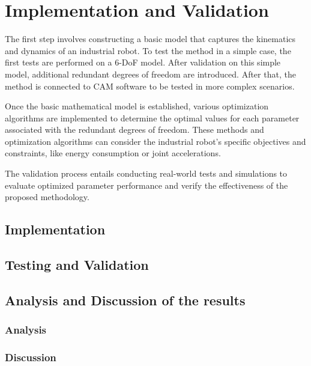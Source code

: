 \chapter{Implementation and Validation}%

The first step involves constructing a basic model that captures the kinematics and dynamics of an industrial robot. To test the method in a simple case, the first tests are performed on a 6-DoF model. After validation on this simple model, additional redundant degrees of freedom are introduced. After that, the method is connected to CAM software to be tested in more complex scenarios.

Once the basic mathematical model is established, various optimization algorithms are implemented to determine the optimal values for each parameter associated with the redundant degrees of freedom. These methods and optimization algorithms can consider the industrial robot's specific objectives and constraints, like energy consumption or joint accelerations. 


The validation process entails conducting real-world tests and simulations to evaluate optimized parameter performance and verify the effectiveness of the proposed methodology.
\section{Implementation}%

\section{Testing and Validation}%

\section{Analysis and Discussion of the results}%


\subsection{Analysis}
\subsection{Discussion}%